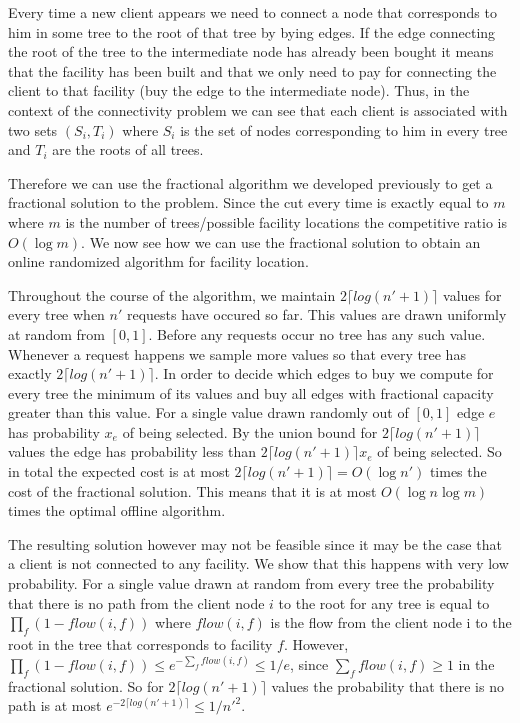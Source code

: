 Every time a new client appears we need to connect a node that corresponds to him in some tree to the root of that tree by bying edges. If the edge connecting the root of the tree to the intermediate node has already been bought it means that the facility has been built and that we only need to pay for connecting the client to that facility (buy the edge to the intermediate node). Thus, in the context of the connectivity problem we can see that each client is associated with two sets $(S_i,T_i)$ where $S_i$ is the set of nodes corresponding to him in every tree and $T_i$ are the roots of all trees.

Therefore we can use the fractional algorithm we developed previously to get a fractional solution to the problem. Since the cut every time is exactly equal to $m$ where $m$ is the number of trees/possible facility locations the competitive ratio is $O(\log m)$. We now see how we can use the fractional solution to obtain an online randomized algorithm for facility location.

Throughout the course of the algorithm, we maintain $2 \lceil log(n'+1) \rceil$ values for every tree when $n'$ requests have occured so far. This values are drawn uniformly at random from $[0,1]$. Before any requests occur no tree has any such value. Whenever a request happens we sample more values so that every tree has exactly $2 \lceil log(n'+1) \rceil$. In order to decide which edges to buy we compute for every tree the minimum of its values and buy all edges with fractional capacity greater than this value. For a single value drawn randomly out of $[0,1]$ edge $e$ has probability $x_e$ of being selected. By the union bound for $2 \lceil log(n'+1) \rceil$ values the edge has probability less than $2 \lceil log(n'+1) \rceil x_e$ of being selected. So in total the expected cost is at most $2 \lceil log(n'+1) \rceil = O(\log n')$ times the cost of the fractional solution. This means that it is at most $O(\log n \log m)$ times the optimal offline algorithm.

The resulting solution however may not be feasible since it may be the case that a client is not connected to any facility. We show that this happens with very low probability. For a single value drawn at random from every tree the probability that there is no path from the client node $i$ to the root for any tree is equal to $\prod_f (1-flow(i,f))$ where $flow(i,f)$ is the flow from the client node i to the root in the tree that corresponds to facility $f$. However, $\prod_f (1-flow(i,f)) \le e^{-\sum_f flow(i,f)} \le 1/e$, since $\sum_f flow(i,f) \ge 1$ in the fractional solution. So for $2 \lceil log(n'+1) \rceil$ values the probability that there is no path is at most $e^{-2 \lceil log(n'+1) \rceil} \le 1/n'^2$.

